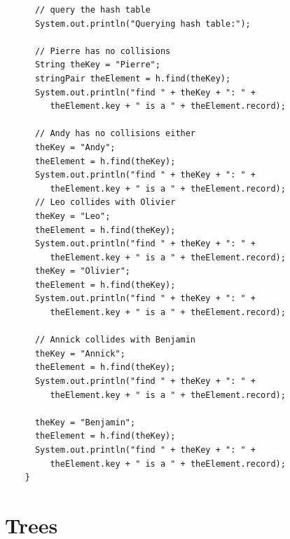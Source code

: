 \documentclass[a4paper]{book}
\theoremstyle{changebreak}                %
\begin{document}
{\begin{verbatim}
      // query the hash table
      System.out.println("Querying hash table:");
      
      // Pierre has no collisions
      String theKey = "Pierre";
      stringPair theElement = h.find(theKey);
      System.out.println("find " + theKey + ": " + 
         theElement.key + " is a " + theElement.record);
     
      // Andy has no collisions either
      theKey = "Andy";
      theElement = h.find(theKey);
      System.out.println("find " + theKey + ": " + 
         theElement.key + " is a " + theElement.record);
      // Leo collides with Olivier
      theKey = "Leo";
      theElement = h.find(theKey);
      System.out.println("find " + theKey + ": " + 
         theElement.key + " is a " + theElement.record);
      theKey = "Olivier";
      theElement = h.find(theKey);
      System.out.println("find " + theKey + ": " + 
         theElement.key + " is a " + theElement.record);
     
      // Annick collides with Benjamin
      theKey = "Annick";
      theElement = h.find(theKey);
      System.out.println("find " + theKey + ": " + 
         theElement.key + " is a " + theElement.record);
     
      theKey = "Benjamin";
      theElement = h.find(theKey);
      System.out.println("find " + theKey + ": " + 
         theElement.key + " is a " + theElement.record);
    }
\end{verbatim}
}

\chapter{Trees}

\begin{center}
\end{center}
\end{document}
